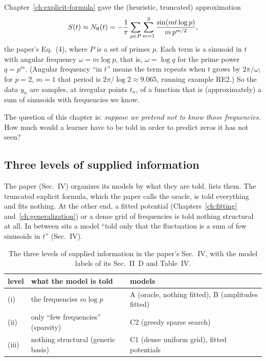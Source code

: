 Chapter~\ref{ch:explicit-formula} gave the (heuristic, truncated) approximation
\begin{equation}
S(t)\approx N_{\mathrm{fl}}(t)=-\frac1\pi\sum_{p\in P}\sum_{m=1}^{3}\frac{\sin(mt\log p)}{m\,p^{m/2}},
\label{eq:sparse-frequency-nfl}
\end{equation}
the paper's Eq.~(4), where $P$ is a set of primes $p$. Each term is a sinusoid in $t$ with angular frequency $\omega=m\log p$, that is, $\omega=\log q$ for the prime power $q=p^m$. (Angular frequency ``in $t$'' means the term repeats when $t$ grows by $2\pi/\omega$; for $p=2$, $m=1$ that period is $2\pi/\log2\approx9.065$, running example RE2.) So the data $y_n$ are samples, at irregular points $t_n$, of a function that is (approximately) a sum of sinusoids with frequencies we know.

The question of this chapter is: \emph{suppose we pretend not to know those frequencies.} How much would a learner have to be told in order to predict zeros it has not seen?

\subsection{Three levels of supplied information}

The paper (Sec.~IV) organizes its models by what they are told.  lists them. The truncated explicit formula, which the paper calls the oracle, is told everything and fits nothing. At the other end, a fitted potential (Chapters~\ref{ch:fitting} and~\ref{ch:generalization}) or a dense grid of frequencies is told nothing structural at all. In between sits a model ``told only that the fluctuation is a sum of few sinusoids in $t$'' (Sec.~IV).

\begin{table}[htbp]\centering
\caption{The three levels of supplied information in the paper's Sec.~IV, with the model labels of its Sec.~II~D and Table~IV.}
\label{tab:sparse-frequency-levels}
\begin{tabular}{lll}
\toprule
level & what the model is told & models \\
\midrule
(i) & the frequencies $m\log p$ & A (oracle, nothing fitted), B (amplitudes fitted)\\
(ii) & only ``few frequencies'' (sparsity) & C2 (greedy sparse search)\\
(iii) & nothing structural (generic basis) & C1 (dense uniform grid), fitted potentials\\
\bottomrule
\end{tabular}
\end{table}

